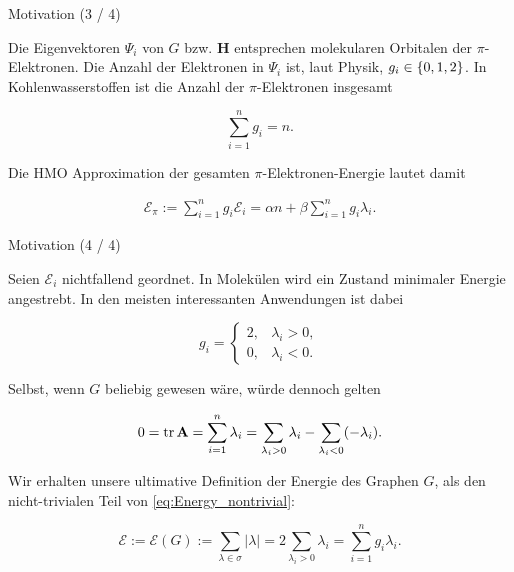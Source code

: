 \documentclass[aspectratio = 169]{beamer}
\begin{document}
\begin{frame}{Motivation (3 / 4)}

    \begin{block}{}

        Die Eigenvektoren $\Psi_i$ von $G$ bzw. $\mathbf H$ entsprechen molekularen Orbitalen der $\pi$-Elektronen.
        Die Anzahl der Elektronen in $\Psi_i$ ist, laut Physik, $g_i \in {\left \{ 0, 1, 2 \right \}}$.
        In Kohlenwasserstoffen ist die Anzahl der $\pi$-Elektronen insgesamt

        \[
            \sum_{i=1}^n g_i = n.
        \]

        Die HMO Approximation der gesamten $\pi$-Elektronen-Energie lautet damit

        \begin{align} \label{eq:Energy_nontrivial}
            \mathcal E_\pi
            :=
            \sum_{i=1}^n g_i \mathcal E_i
            =
            \alpha n + \beta \sum_{i=1}^n g_i \lambda_i.
        \end{align}

    \end{block}

\end{frame}


\begin{frame}{Motivation (4 / 4)}

    \begin{block}{}

        Seien $\mathcal E_i$ nichtfallend geordnet.
        In Molekülen wird ein Zustand minimaler Energie angestrebt.
        In den meisten interessanten Anwendungen ist dabei

        \[
            g_i
            =
            \begin{cases}
                2, & \lambda_i > 0, \\
                0, & \lambda_i < 0.
            \end{cases}
        \]

        Selbst, wenn $G$ beliebig gewesen wäre, würde dennoch gelten

        \[
            0
            =
            \operatorname{tr} \mathbf A
            =
            \sum_{i=1}^n \lambda_i
            =
            \sum_{\lambda_i > 0} \lambda_i
            -
            \sum_{\lambda_i < 0} (-\lambda_i).
        \]

        Wir erhalten unsere ultimative Definition der Energie des Graphen $G$, als den nicht-trivialen Teil von \eqref{eq:Energy_nontrivial}:

        \[
            \mathcal E
            :=
            \mathcal E(G)
            :=
            \sum_{\lambda \in \sigma} |\lambda|
            =
            2 \sum_{\lambda_i > 0} \lambda_i
            =
            \sum_{i=1}^n g_i \lambda_i.            
        \]

    \end{block}

\end{frame}
\end{document}

